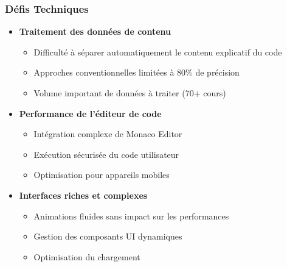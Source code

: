 \documentclass{beamer}
\begin{document}
\begin{frame}
\frametitle{Défis Techniques}
\begin{itemize}
    \item \textbf{Traitement des données de contenu}
    \begin{itemize}
        \item Difficulté à séparer automatiquement le contenu explicatif du code
        \item Approches conventionnelles limitées à 80\% de précision
        \item Volume important de données à traiter (70+ cours)
    \end{itemize}
    \item \textbf{Performance de l'éditeur de code}
    \begin{itemize}
        \item Intégration complexe de Monaco Editor
        \item Exécution sécurisée du code utilisateur
        \item Optimisation pour appareils mobiles
    \end{itemize}
    \item \textbf{Interfaces riches et complexes}
    \begin{itemize}
        \item Animations fluides sans impact sur les performances
        \item Gestion des composants UI dynamiques
        \item Optimisation du chargement
    \end{itemize}
\end{itemize}
\end{frame}
\end{document}
